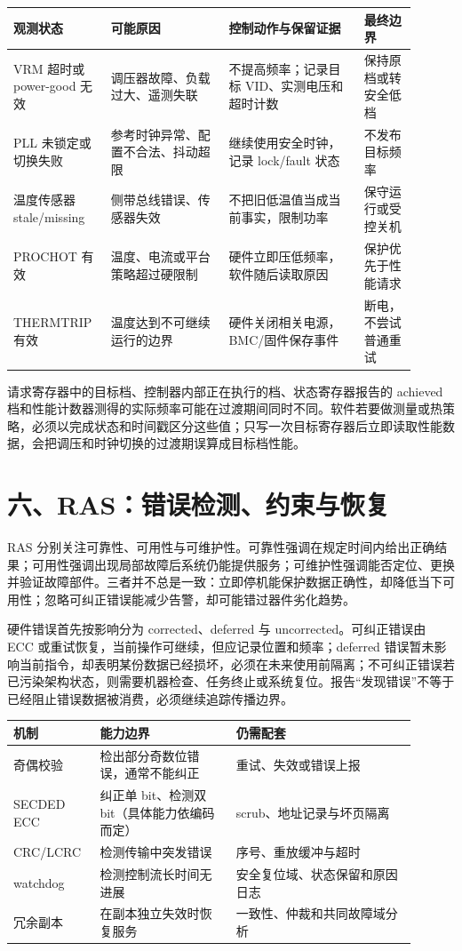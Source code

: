 \begin{longtable}{L{0.20\linewidth}L{0.27\linewidth}L{0.31\linewidth}L{0.12\linewidth}}
\toprule
观测状态 & 可能原因 & 控制动作与保留证据 & 最终边界 \\
\midrule
VRM 超时或 power-good 无效 & 调压器故障、负载过大、遥测失联 & 不提高频率；记录目标 VID、实测电压和超时计数 & 保持原档或转安全低档 \\\tablerowrule
PLL 未锁定或切换失败 & 参考时钟异常、配置不合法、抖动超限 & 继续使用安全时钟，记录 lock/fault 状态 & 不发布目标频率 \\\tablerowrule
温度传感器 stale/missing & 侧带总线错误、传感器失效 & 不把旧低温值当成当前事实，限制功率 & 保守运行或受控关机 \\\tablerowrule
PROCHOT 有效 & 温度、电流或平台策略超过硬限制 & 硬件立即压低频率，软件随后读取原因 & 保护优先于性能请求 \\\tablerowrule
THERMTRIP 有效 & 温度达到不可继续运行的边界 & 硬件关闭相关电源，BMC/固件保存事件 & 断电，不尝试普通重试 \\
\bottomrule
\end{longtable}

请求寄存器中的目标档、控制器内部正在执行的档、状态寄存器报告的 achieved 档和性能计数器测得的实际频率可能在过渡期间同时不同。软件若要做测量或热策略，必须以完成状态和时间戳区分这些值；只写一次目标寄存器后立即读取性能数据，会把调压和时钟切换的过渡期误算成目标档性能。
\section{六、RAS：错误检测、约束与恢复}

RAS 分别关注可靠性、可用性与可维护性。可靠性强调在规定时间内给出正确结果；可用性强调出现局部故障后系统仍能提供服务；可维护性强调能否定位、更换并验证故障部件。三者并不总是一致：立即停机能保护数据正确性，却降低当下可用性；忽略可纠正错误能减少告警，却可能错过器件劣化趋势。

硬件错误首先按影响分为 corrected、deferred 与 uncorrected。可纠正错误由 ECC 或重试恢复，当前操作可继续，但应记录位置和频率；deferred 错误暂未影响当前指令，却表明某份数据已经损坏，必须在未来使用前隔离；不可纠正错误若已污染架构状态，则需要机器检查、任务终止或系统复位。报告“发现错误”不等于已经阻止错误数据被消费，必须继续追踪传播边界。

\begin{longtable}{L{0.18\linewidth}L{0.31\linewidth}L{0.41\linewidth}}
\toprule
机制 & 能力边界 & 仍需配套 \\
\midrule
奇偶校验 & 检出部分奇数位错误，通常不能纠正 & 重试、失效或错误上报 \\\tablerowrule
SECDED ECC & 纠正单 bit、检测双 bit（具体能力依编码而定） & scrub、地址记录与坏页隔离 \\\tablerowrule
CRC/LCRC & 检测传输中突发错误 & 序号、重放缓冲与超时 \\\tablerowrule
watchdog & 检测控制流长时间无进展 & 安全复位域、状态保留和原因日志 \\\tablerowrule
冗余副本 & 在副本独立失效时恢复服务 & 一致性、仲裁和共同故障域分析 \\
\bottomrule
\end{longtable}

